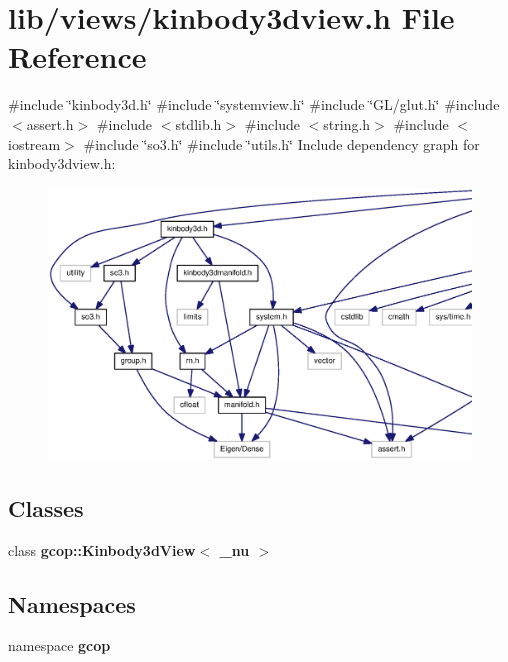 \section{lib/views/kinbody3dview.h \-File \-Reference}
\label{kinbody3dview_8h}
{\ttfamily \#include \char`\"{}kinbody3d.\-h\char`\"{}}\*
{\ttfamily \#include \char`\"{}systemview.\-h\char`\"{}}\*
{\ttfamily \#include \char`\"{}\-G\-L/glut.\-h\char`\"{}}\*
{\ttfamily \#include $<$assert.\-h$>$}\*
{\ttfamily \#include $<$stdlib.\-h$>$}\*
{\ttfamily \#include $<$string.\-h$>$}\*
{\ttfamily \#include $<$iostream$>$}\*
{\ttfamily \#include \char`\"{}so3.\-h\char`\"{}}\*
{\ttfamily \#include \char`\"{}utils.\-h\char`\"{}}\*
\-Include dependency graph for kinbody3dview.\-h\-:\nopagebreak
\begin{figure}[H]
\begin{center}
\leavevmode
\includegraphics[width=350pt]{kinbody3dview_8h__incl}
\end{center}
\end{figure}
\subsection*{\-Classes}
\begin{DoxyCompactItemize}
\item 
class {\bf gcop\-::\-Kinbody3d\-View$<$ \-\_\-nu $>$}
\end{DoxyCompactItemize}
\subsection*{\-Namespaces}
\begin{DoxyCompactItemize}
\item 
namespace {\bf gcop}
\end{DoxyCompactItemize}

